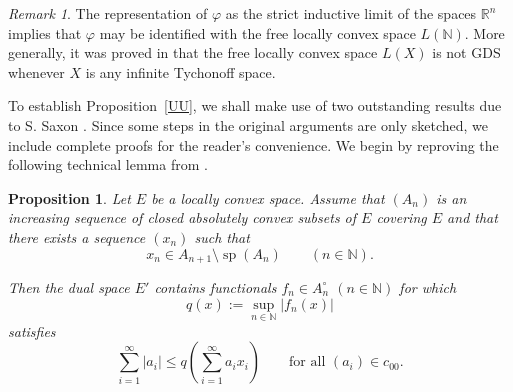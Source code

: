 \documentclass[12pt]{amsart}
\theoremstyle{plain}
\newtheorem{proposition}[theorem]{Proposition}
\theoremstyle{definition}
\theoremstyle{remark}
\newtheorem{remark}[theorem]{Remark}
\begin{document}
\begin{remark}
The representation of $\varphi$ as the strict inductive limit of the spaces $\mathbb R^n$ implies that $\varphi$ may be identified with the free locally convex space $L(\mathbb N)$. More generally, it was proved in \cite{Kakol-Leiderman} that the free locally convex space $L(X)$ is not GDS whenever $X$ is any infinite Tychonoff space.
\end{remark}

To establish Proposition~\ref{UU}, we shall make use of two outstanding results due to S. Saxon \cite{Saxon}. Since some steps in the original arguments are only sketched, we include complete proofs for the reader's convenience. We begin by reproving the following technical lemma from \cite[Lemma]{Saxon}.

\begin{proposition}
Let $E$ be a locally convex space. Assume that  $(A_n)$ is an increasing sequence of closed absolutely convex subsets of $E$ covering $E$
and that there exists a sequence $(x_n)$ such that
\[
x_n\in A_{n+1}\setminus \operatorname{sp}(A_n)
\qquad (n\in\mathbb N).
\]

Then the dual space $E'$ contains functionals $f_n\in A_n^\circ$ $(n\in\mathbb N)$ for which
\[
q(x):=\sup_{n\in\mathbb N}|f_n(x)|
\]
satisfies
\[
\sum_{i=1}^{\infty}|a_i|
\le
q\!\left(\sum_{i=1}^{\infty}a_i x_i\right)
\qquad\text{for all }(a_i)\in c_{00}.
\]
\end{proposition}
\end{document}
